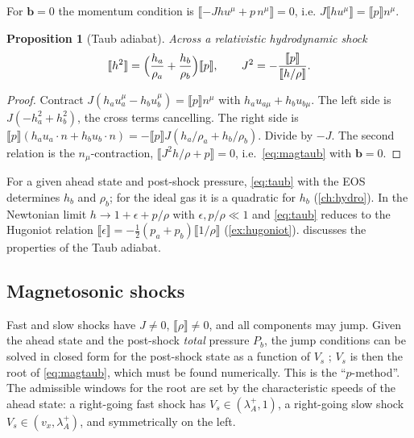 \documentclass[11pt,a4paper,oneside,openany]{book}
\newcommand{\textcite}{\citet}
\newcommand{\parencite}{\citep}
\theoremstyle{definition}
\theoremstyle{plain}
\newtheorem{proposition}{Proposition}[chapter]
\theoremstyle{remark}
\newcommand{\jump}[1]{\llbracket #1\rrbracket}
\newcommand{\Ptot}{P}
\begin{document}
For $\bm b=0$ the momentum condition is $\jump{-Jhu^\mu+p\,n^\mu}=0$, i.e.
$J\jump{hu^\mu}=\jump{p}n^\mu$.

\begin{proposition}[Taub adiabat]\label{prop:taub}
Across a relativistic hydrodynamic shock \parencite{Taub1948}
\begin{equation}\label{eq:taub}
\jump{h^2}=\Bigl(\frac{h_a}{\rho_a}+\frac{h_b}{\rho_b}\Bigr)\jump{p},\qquad
J^2=-\frac{\jump{p}}{\jump{h/\rho}} .
\end{equation}
\end{proposition}
\begin{proof}
Contract $J(h_au_a^\mu-h_bu_b^\mu)=\jump{p}n^\mu$ with $h_au_{a\mu}+h_bu_{b\mu}$. The left
side is $J(-h_a^2+h_b^2)$, the cross terms cancelling. The right side is
$\jump{p}(h_au_a\cdot n+h_bu_b\cdot n)=-\jump{p}J(h_a/\rho_a+h_b/\rho_b)$. Divide by $-J$.
The second relation is the $n_\mu$-contraction, $\jump{J^2h/\rho+p}=0$, i.e.\
\eqref{eq:magtaub} with $\bm b=0$.
\end{proof}

For a given ahead state and post-shock pressure, \eqref{eq:taub} with the EOS determines
$h_b$ and $\rho_b$; for the ideal gas it is a quadratic for $h_b$ (\cref{ch:hydro}). In the
Newtonian limit $h\to1+\epsilon+p/\rho$ with $\epsilon,p/\rho\ll1$ and \eqref{eq:taub}
reduces to the Hugoniot relation $\jump{\epsilon}=-\tfrac12(p_a+p_b)\jump{1/\rho}$
(\cref{ex:hugoniot}). \textcite{Thorne1973} discusses the properties of the Taub adiabat.

\subsection{Magnetosonic shocks}

Fast and slow shocks have $J\ne0$, $\jump{\rho}\ne0$, and all components may jump. Given
the ahead state and the post-shock \emph{total} pressure $\Ptot_b$, the jump conditions
can be solved in closed form for the post-shock state as a function of $V_s$
\parencite[eqs.~4.13--4.25 and Appendix~A]{GiacomazzoRezzolla2006}; $V_s$ is then the
root of \eqref{eq:magtaub}, which must be found numerically. This is the ``$p$-method''.
The admissible windows for the root are set by the characteristic speeds of the ahead
state: a right-going fast shock has $V_s\in(\lambda_A^+,1)$, a right-going slow shock
$V_s\in(v_x,\lambda_A^+)$, and symmetrically on the left.
\end{document}
